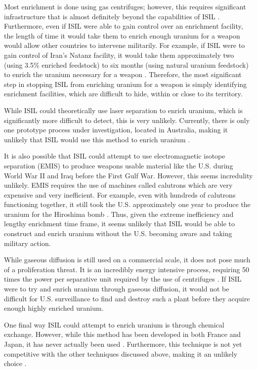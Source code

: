 \documentclass{report}
\begin{document}
Most enrichment is done using gas centrifuges; however, this requires significant infrastructure that is almost definitely beyond the capabilities of ISIL \cite{Benedict1981}.  Furthermore, even if ISIL were able to gain control over an enrichment facility, the length of time it would take them to enrich enough uranium for a weapon would allow other countries to intervene militarily. For example, if ISIL were to gain control of Iran's Natanz facility, it would take them approximately two (using 3.5\% enriched feedstock) to six months (using natural uranium feedstock) to enrich the uranium necessary for a weapon \cite{WisconsinProjectonNuclearArmsControl2015,Heinonen2015}. Therefore, the most significant step  in stopping ISIL from enriching uranium for a weapon is simply identifying enrichment facilities, which are difficult to hide, within or close to its territory. 

While ISIL could theoretically use laser separation to enrich uranium, which is significantly more difficult to detect, this is very unlikely. Currently, there is only one prototype process under investigation, located in Australia, making it unlikely that ISIL would use this method to enrich uranium \cite{Moody2014}. 

It is also possible that ISIL could attempt to use electromagnetic isotope separation (EMIS) to produce weapons usable material like the U.S. during World War II and Iraq before the First Gulf War. However, this seems incredulity unlikely. EMIS requires the use of machines called calutrons which are very expensive and very inefficient. For example, even with hundreds of calutrons functioning together, it still took the U.S. approximately one year to produce the uranium for the Hiroshima bomb \cite{Moody2014}. Thus, given the extreme inefficiency and lengthy enrichment time frame, it seems unlikely that ISIL would be able to construct and enrich uranium without the U.S. becoming aware and taking military action.

While gaseous diffusion is still used on a commercial scale, it does not pose much of a proliferation threat. It is an incredibly energy intensive process, requiring 50 times the power per separative unit required by the use of centrifuges \cite{WorldNuclearAssociation2015b}. If ISIL were to try and enrich uranium through gaseous diffusion, it would not be difficult for U.S. surveillance to find and destroy such a plant before they acquire enough highly enriched uranium.

One final way ISIL could attempt to enrich uranium is through chemical exchange. However, while this method has been developed in both France and Japan, it has never actually been used \cite{Africa2012}. Furthermore, this technique is not yet competitive with the other techniques discussed above, making it an unlikely choice \cite{Moody2014}. 
\end{document}
